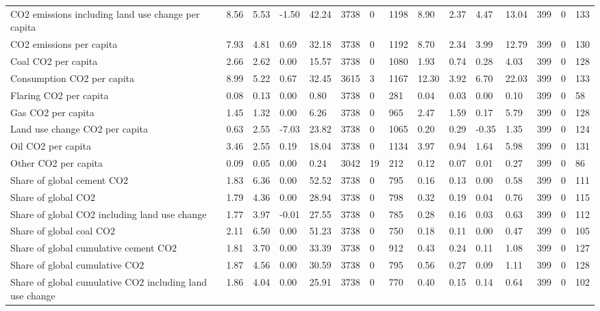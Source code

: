 \begin{longtable}{lllllllllllllll}
CO2 emissions including land use change per capita & 8.56 & 5.53 & -1.50 & 42.24 & 3738 & 0 & 1198 & 8.90 & 2.37 & 4.47 & 13.04 & 399 & 0 & 133\\
CO2 emissions per capita & 7.93 & 4.81 & 0.69 & 32.18 & 3738 & 0 & 1192 & 8.70 & 2.34 & 3.99 & 12.79 & 399 & 0 & 130\\
Coal CO2 per capita & 2.66 & 2.62 & 0.00 & 15.57 & 3738 & 0 & 1080 & 1.93 & 0.74 & 0.28 & 4.03 & 399 & 0 & 128\\
Consumption CO2 per capita & 8.99 & 5.22 & 0.67 & 32.45 & 3615 & 3 & 1167 & 12.30 & 3.92 & 6.70 & 22.03 & 399 & 0 & 133\\
\addlinespace
Flaring CO2 per capita & 0.08 & 0.13 & 0.00 & 0.80 & 3738 & 0 & 281 & 0.04 & 0.03 & 0.00 & 0.10 & 399 & 0 & 58\\
Gas CO2 per capita & 1.45 & 1.32 & 0.00 & 6.26 & 3738 & 0 & 965 & 2.47 & 1.59 & 0.17 & 5.79 & 399 & 0 & 128\\
Land use change CO2 per capita & 0.63 & 2.55 & -7.03 & 23.82 & 3738 & 0 & 1065 & 0.20 & 0.29 & -0.35 & 1.35 & 399 & 0 & 124\\
Oil CO2 per capita & 3.46 & 2.55 & 0.19 & 18.04 & 3738 & 0 & 1134 & 3.97 & 0.94 & 1.64 & 5.98 & 399 & 0 & 131\\
Other CO2 per capita & 0.09 & 0.05 & 0.00 & 0.24 & 3042 & 19 & 212 & 0.12 & 0.07 & 0.01 & 0.27 & 399 & 0 & 86\\
\addlinespace
Share of global cement CO2 & 1.83 & 6.36 & 0.00 & 52.52 & 3738 & 0 & 795 & 0.16 & 0.13 & 0.00 & 0.58 & 399 & 0 & 111\\
Share of global CO2 & 1.79 & 4.36 & 0.00 & 28.94 & 3738 & 0 & 798 & 0.32 & 0.19 & 0.04 & 0.76 & 399 & 0 & 115\\
Share of global CO2 including land use change & 1.77 & 3.97 & -0.01 & 27.55 & 3738 & 0 & 785 & 0.28 & 0.16 & 0.03 & 0.63 & 399 & 0 & 112\\
Share of global coal CO2 & 2.11 & 6.50 & 0.00 & 51.23 & 3738 & 0 & 750 & 0.18 & 0.11 & 0.00 & 0.47 & 399 & 0 & 105\\
Share of global cumulative cement CO2 & 1.81 & 3.70 & 0.00 & 33.39 & 3738 & 0 & 912 & 0.43 & 0.24 & 0.11 & 1.08 & 399 & 0 & 127\\
\addlinespace
Share of global cumulative CO2 & 1.87 & 4.56 & 0.00 & 30.59 & 3738 & 0 & 795 & 0.56 & 0.27 & 0.09 & 1.11 & 399 & 0 & 128\\
Share of global cumulative CO2 including land use change & 1.86 & 4.04 & 0.00 & 25.91 & 3738 & 0 & 770 & 0.40 & 0.15 & 0.14 & 0.64 & 399 & 0 & 102\\

\end{longtable}
